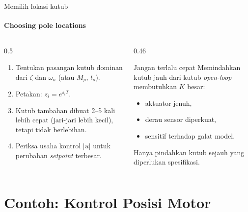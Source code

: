 \documentclass[aspectratio=169,10pt]{beamer}
\begin{document}
\begin{frame}{Memilih lokasi kutub}
	\framesubtitle{Choosing pole locations}
	\begin{columns}[T]
		\begin{column}{0.5\textwidth}
			\small
			\begin{enumerate}
				\item Tentukan pasangan kutub dominan dari $\zeta$ dan $\omega_n$ (atau $M_p$, $t_s$).
				\item Petakan: $z_i = e^{s_iT}$.
				\item Kutub tambahan dibuat 2--5 kali lebih cepat (jari-jari lebih kecil), tetapi tidak berlebihan.
				\item Periksa usaha kontrol $|u|$ untuk perubahan \textit{setpoint} terbesar.
			\end{enumerate}
		\end{column}
		\begin{column}{0.46\textwidth}
			\begin{alertblock}{Jangan terlalu cepat}
				\small
				Memindahkan kutub jauh dari kutub \textit{open-loop} membutuhkan $K$ besar:
				\begin{itemize}
					\item aktuator jenuh,
					\item derau sensor diperkuat,
					\item sensitif terhadap galat model.
				\end{itemize}
				Hanya pindahkan kutub sejauh yang diperlukan spesifikasi.
			\end{alertblock}
		\end{column}
	\end{columns}
\end{frame}

\section{Contoh: Kontrol Posisi Motor\texorpdfstring{\\[4pt]{\Large{}}}{ / Example: Motor Position Control}}
\end{document}
